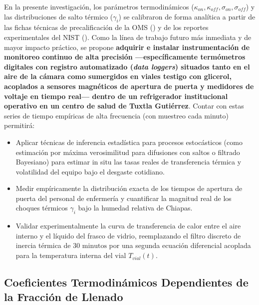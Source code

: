 \documentclass[
  spanish,
  letterpaper,
  DIV=11,
  numbers=noendperiod]{scrreprt}
\providecommand{\tightlist}{%
  \setlength{\itemsep}{0pt}\setlength{\parskip}{0pt}}
\theoremstyle{plain}
\theoremstyle{plain}
\theoremstyle{plain}
\theoremstyle{definition}
\theoremstyle{remark}
\begin{document}
En la presente investigación, los parámetros termodinámicos
(\(\kappa_{on}, \kappa_{off}, \sigma_{on}, \sigma_{off}\)) y las
distribuciones de salto térmico (\(\gamma_i\)) se calibraron de forma
analítica a partir de las fichas técnicas de precalificación de la OMS
() y
de los reportes experimentales del NIST
(). Como la línea
de trabajo futuro más inmediata y de mayor impacto práctico, se propone
\textbf{adquirir e instalar instrumentación de monitoreo continuo de
alta precisión ---específicamente termómetros digitales con registro
automatizado (\emph{data loggers}) situados tanto en el aire de la
cámara como sumergidos en viales testigo con glicerol, acoplados a
sensores magnéticos de apertura de puerta y medidores de voltaje en
tiempo real--- dentro de un refrigerador institucional operativo en un
centro de salud de Tuxtla Gutiérrez}. Contar con estas series de tiempo
empíricas de alta frecuencia (con muestreo cada minuto) permitirá:

\begin{itemize}
\tightlist
\item
  Aplicar técnicas de inferencia estadística para procesos estocásticos
  (como estimación por máxima verosimilitud para difusiones con saltos o
  filtrado Bayesiano) para estimar in situ las tasas reales de
  transferencia térmica y volatilidad del equipo bajo el desgaste
  cotidiano.
\item
  Medir empíricamente la distribución exacta de los tiempos de apertura
  de puerta del personal de enfermería y cuantificar la magnitud real de
  los choques térmicos \(\gamma_i\) bajo la humedad relativa de Chiapas.
\item
  Validar experimentalmente la curva de transferencia de calor entre el
  aire interno y el líquido del frasco de vidrio, reemplazando el filtro
  discreto de inercia térmica de \(30\text{ minutos}\) por una segunda
  ecuación diferencial acoplada para la temperatura interna del vial
  \(T_{vial}(t)\).
\end{itemize}

\subsection{Coeficientes Termodinámicos Dependientes de la Fracción de
Llenado}\label{coeficientes-termodinuxe1micos-dependientes-de-la-fracciuxf3n-de-llenado}
\end{document}
